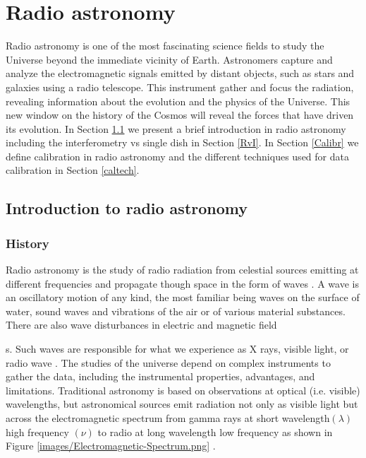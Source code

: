 \chapter{Radio astronomy}



Radio astronomy is one of the most fascinating science fields to study the Universe beyond the immediate vicinity of Earth. Astronomers capture and analyze the electromagnetic signals emitted by distant objects, such as stars and galaxies using a radio telescope. This instrument gather and focus the radiation, revealing information about the evolution and the physics of the Universe. This new window on the history of the Cosmos will reveal the forces that have driven its evolution. In Section \ref{Ra} we present a brief introduction in radio astronomy including the interferometry vs single dish in Section \ref{RvI}. In Section \ref{Calibr} we define calibration in radio astronomy and the different techniques used for data calibration in Section \ref{caltech}. 
\section{Introduction to radio astronomy}
\label{Ra}
\subsection{History}


Radio astronomy is the study of radio radiation from celestial sources emitting at different frequencies  and propagate though space in the form of waves \citep{verschuur2015invisible}. A wave is an oscillatory motion of any kind, the most familiar being waves on the surface of water, sound waves and vibrations of the air or of various material substances. There are also wave disturbances in electric and magnetic field\newtheorem{mydef}{Definition}s. Such waves are responsible for what we experience as X rays, visible light, or radio wave \citep{cassidy2002wave}. The studies of the universe depend on complex instruments to gather the data, including the instrumental properties, advantages, and limitations. Traditional astronomy is based on observations at optical (i.e. visible) wavelengths, but astronomical sources emit radiation not only as visible light but
across the electromagnetic spectrum from gamma rays at short wavelength$(\lambda)$ high frequency $(\nu)$ to radio at long wavelength low frequency as shown in Figure \ref{images/Electromagnetic-Spectrum.png} \citep{staats2016genetic}.

